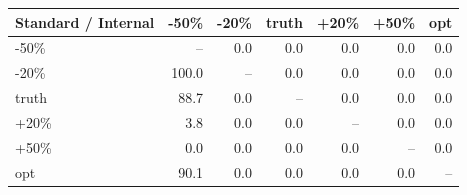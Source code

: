 \begin{tabular}{@{}lrrrrrr@{}}
\toprule
Standard / Internal & -50\% & -20\% & truth & +20\% & +50\% & opt \\
\midrule
-50\% & -- & 0.0 & 0.0 & 0.0 & 0.0 & 0.0 \\
-20\% & 100.0 & -- & 0.0 & 0.0 & 0.0 & 0.0 \\
truth & 88.7 & 0.0 & -- & 0.0 & 0.0 & 0.0 \\
+20\% & 3.8 & 0.0 & 0.0 & -- & 0.0 & 0.0 \\
+50\% & 0.0 & 0.0 & 0.0 & 0.0 & -- & 0.0 \\
opt & 90.1 & 0.0 & 0.0 & 0.0 & 0.0 & -- \\
\bottomrule
\end{tabular}

